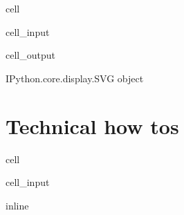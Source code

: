 \documentclass[letterpaper,10pt,english]{jupyterBook}
\begin{document}
\begin{sphinxuseclass}{cell}\begin{sphinxVerbatimInput}

\begin{sphinxuseclass}{cell_input}
\begin{sphinxVerbatim}[commandchars=\\\{\}]
 
\end{sphinxVerbatim}

\end{sphinxuseclass}\end{sphinxVerbatimInput}
\begin{sphinxVerbatimOutput}

\begin{sphinxuseclass}{cell_output}
\begin{sphinxVerbatim}[commandchars=\\\{\}]
\PYGZlt{}IPython.core.display.SVG object\PYGZgt{}
\end{sphinxVerbatim}

\end{sphinxuseclass}\end{sphinxVerbatimOutput}

\end{sphinxuseclass}
\sphinxstepscope


\part{Technical how tos}

\sphinxstepscope

\begin{sphinxuseclass}{cell}\begin{sphinxVerbatimInput}

\begin{sphinxuseclass}{cell_input}
\begin{sphinxVerbatim}[commandchars=\\\{\}]
 inline
\end{sphinxVerbatim}

\end{sphinxuseclass}\end{sphinxVerbatimInput}

\end{sphinxuseclass}
\end{document}
